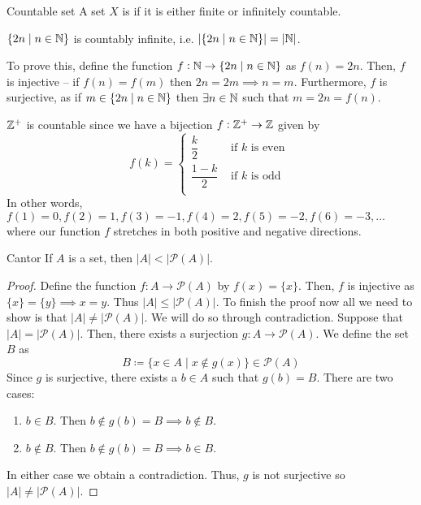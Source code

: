 \begin{defn}{Countable set}{}
A set $X$ is  if it is either finite or infinitely countable.
\end{defn}

\begin{exmp}{}{}
$\{2n \mid n \in \mathbb N\}$ is countably infinite, i.e. $|\{2n \mid n \in \mathbb N\}| = |\mathbb N|$. 

To prove this, define the function $f:\mathbb N \to \{2n \mid n \in \mathbb N\}$ as $f(n) = 2n$. Then, $f$ is injective -- if $f(n) = f(m)$ then $2n=2m \implies n=m$. Furthermore, $f$ is surjective, as if $m \in \{2n \mid n \in \mathbb N\}$ then $\exists n \in \mathbb N$ such that $m = 2n = f(n)$.
\end{exmp}

\begin{exmp}{}{}
$\mathbb Z^{+}$ is countable since we have a bijection $f:\mathbb Z^{+}\to\mathbb Z$ given by
\[ f(k)=\begin{cases}
    \dfrac{k}{2} & \text{ if } k \text{ is even } \\
    \dfrac{1-k}{2} & \text{ if } k \text{ is odd } \\
\end{cases} \]
In other words, $f(1)=0, f(2)=1, f(3)=-1, f(4)=2, f(5)=-2, f(6)=-3, \dots$ where our function $f$ stretches in both positive and negative directions.
\end{exmp}

\begin{thrm}{Cantor}{}
If $A$ is a set, then $|A|<|\mathcal{P}(A)|$.
\end{thrm}
\begin{proof}
Define the function $f:A \to \mathcal{P}(A)$ by $f(x) = \{x\}$. Then, $f$ is injective as $\{x\}=\{y\} \implies x=y$. Thus $|A| \le |\mathcal{P}(A)|$. To finish the proof now all we need to show is that $|A| \neq |\mathcal{P}(A)|$. We will do so through contradiction. Suppose that $|A| = |\mathcal{P}(A)|$. Then, there exists a surjection $g:A \to \mathcal{P}(A)$. We define the set $B$ as
\[ B \coloneq \{x \in A \mid x \notin g(x)\} \in \mathcal{P}(A) \]
Since $g$ is surjective, there exists a $b \in A$ such that $g(b) = B$. There are two cases:
\begin{enumerate}
\item $b \in B$. Then $b \notin g(b) = B \implies b \notin B$.
\item $b \notin B$. Then $b \notin g(b) = B \implies b \in B$.
\end{enumerate}
In either case we obtain a contradiction. Thus, $g$ is not surjective so $|A| \neq |\mathcal{P}(A)|$.
\end{proof}

